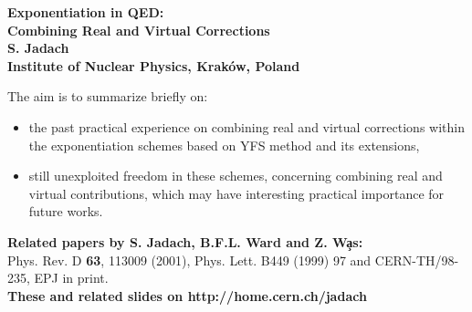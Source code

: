 \documentclass[dvips]{seminar}                      %
\begin{document}



\begin{slide}

\begin{center}
{\LARGE\bf\crd   Exponentiation in QED:\\
                 Combining Real and Virtual Corrections}\\
\vspace{2mm}
{\LARGE\bf\cbl   S. Jadach}\\
\vspace{2mm}
{\large\bf       Institute of Nuclear Physics, Krak\'ow, Poland}
\end{center}

\vspace{1mm}
{\small\Cmar
  The aim is to summarize briefly on:
  \begin{itemize}
  \item the past practical experience on combining
  real and virtual corrections within the exponentiation schemes
  based on YFS method and its extensions,
  \item still unexploited freedom in these schemes,
  concerning combining real and virtual contributions,
  which may have interesting practical importance for future works.
  \end{itemize}
}

\vspace{1mm}
{\bf\small  Related papers by S. Jadach, B.F.L. Ward and Z. W\c{a}s:}\\
{\Cmag
{\scriptsize Phys. Rev. D {\bf 63}, 113009 (2001),}
{\scriptsize Phys. Lett. B449 (1999) 97 and CERN-TH/98-235, EPJ in print.}
}
\\
{\Cblu\small\bf These and related slides on http://home.cern.ch/jadach}
\vfill
\end{slide}   %
\end{document}
